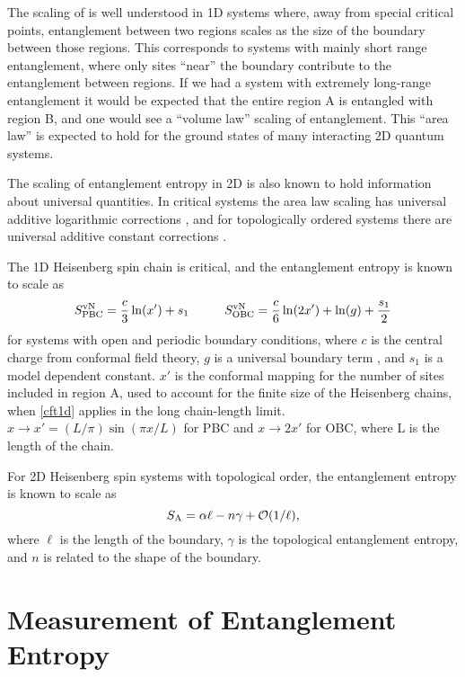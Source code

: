 The scaling of \vn is well understood in 1D systems \cite{ALreview} where, away from special critical points, entanglement between two regions scales as the size of the boundary between those regions.
This corresponds to systems with mainly short range entanglement, where only sites ``near'' the boundary contribute to the entanglement between regions.  
If we had a system with extremely long-range entanglement it would be expected that the entire region A is entangled with region B, and one would see a ``volume law'' scaling of entanglement. 
This ``area law'' \cite{Shredder} is expected to hold for the ground states of many interacting 2D quantum systems.



The scaling of entanglement entropy in 2D is also known to hold information about universal quantities.
In critical systems the area law scaling has universal additive logarithmic corrections \cite{Casini2007,Ryu}, and for topologically ordered systems there are universal additive constant corrections \cite{KP,LW}.

The 1D Heisenberg spin chain is critical, and the entanglement entropy is known to scale as \cite{Cardy} \cite{Zhou2006}
\begin{equation} \label{cft1d} 
	S^{\text{vN}}_{\text{PBC}} = \frac{c}{3}\ln(x') + s_1
	\hspace{1cm}
	S^{\text{vN}}_{\text{OBC}} = \frac{c}{6}\ln(2x') + \ln(g)+ \frac{s_1}{2}
\end{equation}
for systems with open and periodic boundary conditions, where $c$ is the central charge from conformal field theory, $g$ is a universal boundary term \cite{AffleckAndLudwig}, and $s_1$ is a model dependent constant. $x'$ is the conformal mapping for the number of sites included in region A, used to account for the finite size of the Heisenberg chains, when \eqref{cft1d} applies in the long chain-length limit.  $x \rightarrow x' = (L/\pi)\sin(\pi x/L)$ for PBC and $x \rightarrow 2x'$ for OBC, where L is the length of the chain.

For 2D Heisenberg spin systems with topological order, the entanglement entropy is known to scale as \cite{intro}
\begin{equation} \label{AL}
S_{\rm A} = \alpha \ell - n \gamma + \mathcal{O}(1/\ell),
\end{equation}
where $\ell$ is the length of the boundary, $\gamma$ is the topological entanglement entropy\cite{KP,LW}, and $n$ is related to the shape of the boundary.

\section{Measurement of Entanglement Entropy}

